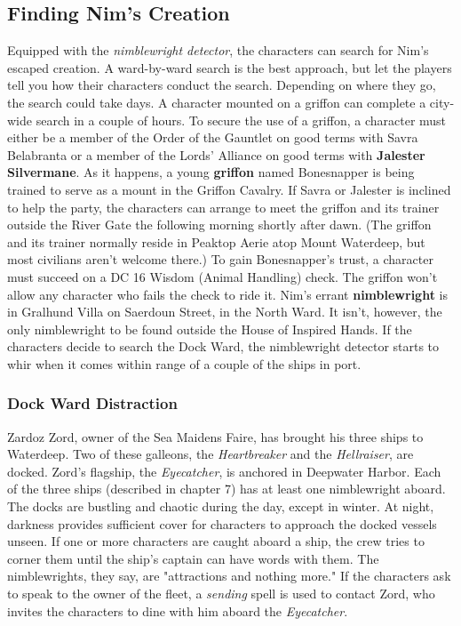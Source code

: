 \documentclass[10pt,a4paper,twoside,twocolumn,openany,nodeprecatedcode]{dndbook}
\begin{document}
\subsection{Finding Nim's Creation}
Equipped with the \textit{nimblewright detector}, the characters can search for Nim's escaped creation. A ward-by-ward search is the best approach, but let the players tell you how their characters conduct the search. Depending on where they go, the search could take days.
A character mounted on a griffon can complete a city-wide search in a couple of hours. To secure the use of a griffon, a character must either be a member of the Order of the Gauntlet on good terms with Savra Belabranta or a member of the Lords' Alliance on good terms with \textbf{Jalester Silvermane}. As it happens, a young \textbf{griffon} named Bonesnapper is being trained to serve as a mount in the Griffon Cavalry. If Savra or Jalester is inclined to help the party, the characters can arrange to meet the griffon and its trainer outside the River Gate the following morning shortly after dawn. (The griffon and its trainer normally reside in Peaktop Aerie atop Mount Waterdeep, but most civilians aren't welcome there.) To gain Bonesnapper's trust, a character must succeed on a DC 16 Wisdom (Animal Handling) check. The griffon won't allow any character who fails the check to ride it.
Nim's errant \textbf{nimblewright} is in Gralhund Villa on Saerdoun Street, in the North Ward. It isn't, however, the only nimblewright to be found outside the House of Inspired Hands. If the characters decide to search the Dock Ward, the nimblewright detector starts to whir when it comes within range of a couple of the ships in port.
\subsubsection{Dock Ward Distraction}
Zardoz Zord, owner of the Sea Maidens Faire, has brought his three ships to Waterdeep. Two of these galleons, the \textit{Heartbreaker} and the \textit{Hellraiser}, are docked. Zord's flagship, the \textit{Eyecatcher}, is anchored in Deepwater Harbor. Each of the three ships (described in chapter 7) has at least one nimblewright aboard.
The docks are bustling and chaotic during the day, except in winter. At night, darkness provides sufficient cover for characters to approach the docked vessels unseen. If one or more characters are caught aboard a ship, the crew tries to corner them until the ship's captain can have words with them. The nimblewrights, they say, are "attractions and nothing more." If the characters ask to speak to the owner of the fleet, a \textit{sending} spell is used to contact Zord, who invites the characters to dine with him aboard the \textit{Eyecatcher}.
\end{document}
